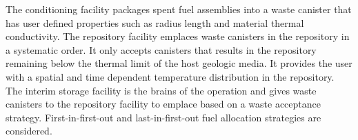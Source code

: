 \documentclass[11pt, letterpaper]{article}
\renewcommand *\footnoterule{}
\begin{document}
The conditioning facility packages spent fuel assemblies into a waste canister 
that has user defined properties such as radius length and material thermal 
conductivity. 
The repository facility emplaces waste canisters in the repository in a
systematic order. 
It only accepts canisters that results in the repository 
remaining below the thermal limit of the host geologic media. 
It provides the user with a spatial and time dependent temperature 
distribution in the repository. 
The interim storage facility is the brains of the operation and gives 
waste canisters to the repository facility to emplace based on a waste 
acceptance strategy. 
First-in-first-out and last-in-first-out fuel allocation strategies 
are considered. 




\end{document}

